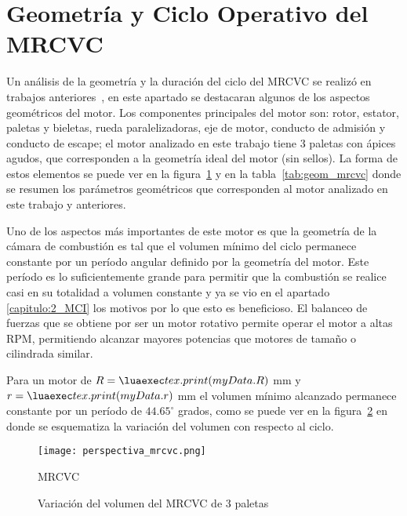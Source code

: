 \section{Geometría y Ciclo Operativo del MRCVC}
%
Un análisis de la geometría y la duración del ciclo del MRCVC se realizó en
trabajos anteriores~\parencite{mrcvc_geom}, en este apartado se destacaran
algunos de los aspectos geométricos del motor.
%
Los componentes principales del motor son: rotor, estator, paletas y bieletas,
rueda paralelizadoras, eje de motor, conducto de admisión y conducto de escape;
el motor analizado en este trabajo tiene 3 paletas con ápices agudos, que
corresponden a la geometría ideal del motor (sin sellos).
%
La forma de estos elementos se puede ver en la figura~\ref{fig:mrcvc} y en la
tabla~\ref{tab:geom_mrcvc} donde se resumen los parámetros geométricos que
corresponden al motor analizado en este trabajo y anteriores.


Uno de los aspectos más importantes de este motor es que la geometría de la
cámara de combustión es tal que el volumen mínimo del ciclo permanece constante
por un período angular definido por la geometría del motor. 
%
Este período es lo suficientemente grande para permitir que la combustión se
realice casi en su totalidad a volumen constante y ya se vio en el apartado
\ref{capitulo:2_MCI} los motivos por lo que esto es beneficioso.
%
El balanceo de fuerzas que se obtiene por ser un motor rotativo permite operar
el motor a altas RPM, permitiendo alcanzar mayores potencias que motores de 
tamaño o cilindrada similar.

Para un motor de $R=\lua{tex.print(myData.R)}$ mm y
$r=\lua{tex.print(myData.r)}$ mm  el volumen mínimo alcanzado permanece
constante por un período de $44.65^\circ$ grados, como se puede ver en la
figura~\ref{fig:vol_constante} en donde se esquematiza la variación del volumen
con respecto al ciclo.

\begin{figure}
    \centering
    \texttt{[image: perspectiva\_mrcvc.png]}
    \caption{MRCVC\parencite{mrcvc_geom}}\label{fig:mrcvc}
\end{figure}

\begin{figure}
    \centering
    \caption{Variación del volumen del MRCVC de 3 paletas}
    \label{fig:vol_constante}
\end{figure}

